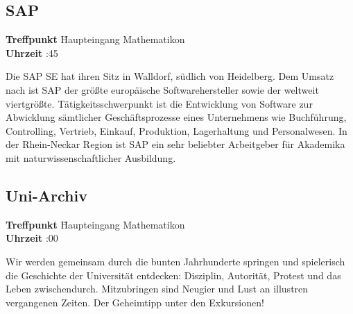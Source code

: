 \subsection*{SAP}
\begin{tabbing}
\textbf{Treffpunkt} \quad \quad \quad \= Haupteingang Mathematikon\\
\textbf{Uhrzeit} :45
\end{tabbing}
Die SAP SE hat ihren Sitz in Walldorf, südlich von Heidelberg. Dem Umsatz nach ist SAP der größte europäische Softwarehersteller sowie der weltweit viertgrößte. Tätigkeitsschwerpunkt ist die Entwicklung von Software zur Abwicklung sämtlicher Geschäftsprozesse eines Unternehmens wie Buchführung, Controlling, Vertrieb, Einkauf, Produktion, Lagerhaltung und Personalwesen. In der Rhein-Neckar Region ist SAP ein sehr beliebter Arbeitgeber für Akademika mit naturwissenschaftlicher Ausbildung. 

\subsection*{Uni-Archiv}
\begin{tabbing}
\textbf{Treffpunkt} \quad \quad \quad \= Haupteingang Mathematikon\\
\textbf{Uhrzeit} :00
\end{tabbing}
Wir werden gemeinsam durch die bunten Jahrhunderte springen und \glqq spielerisch\grqq{} die Geschichte der Universität entdecken: Disziplin, Autorität, Protest und das Leben zwischendurch. Mitzubringen sind Neugier und Lust an illustren vergangenen Zeiten. Der Geheimtipp unter den Exkursionen! 

